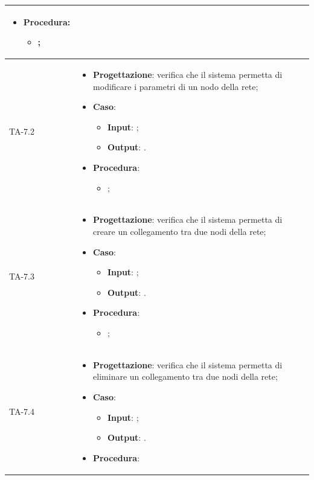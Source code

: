 \begin{longtable}{|C{2.5cm}|C{13cm}|}
\begin{itemize}
	\item \textbf{Procedura}:
	\begin{itemize}
		\item ;
	\end{itemize} 
\end{itemize} \\
\hline
{TA-7.2} &
\begin{itemize}
	\item \textbf{Progettazione}: verifica che il sistema permetta di modificare i parametri di un nodo della rete;
	\item \textbf{Caso}: 
	\begin{itemize}
		\item \textbf{Input}: ;
		\item \textbf{Output}: .
	\end{itemize}
	\item \textbf{Procedura}:
	\begin{itemize}
		\item ;
	\end{itemize} 
\end{itemize} \\
\hline
{TA-7.3} &
\begin{itemize}
	\item \textbf{Progettazione}: verifica che il sistema permetta di creare un collegamento tra due nodi della rete;
	\item \textbf{Caso}: 
	\begin{itemize}
		\item \textbf{Input}: ;
		\item \textbf{Output}: .
	\end{itemize}
	\item \textbf{Procedura}:
	\begin{itemize}
		\item ;
	\end{itemize} 
\end{itemize} \\
\hline
{TA-7.4} &
\begin{itemize}
	\item \textbf{Progettazione}: verifica che il sistema permetta di eliminare un collegamento tra due nodi della rete;
	\item \textbf{Caso}: 
	\begin{itemize}
		\item \textbf{Input}: ;
		\item \textbf{Output}: .
	\end{itemize}
	\item \textbf{Procedura}:

\end{itemize}
\end{longtable}
